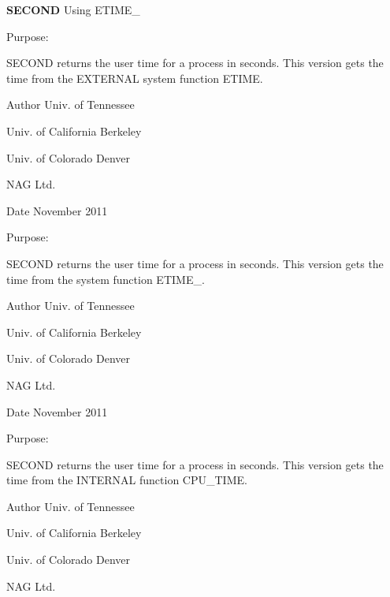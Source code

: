 {\bfseries S\+E\+C\+O\+N\+D} Using E\+T\+I\+M\+E\+\_\+

\begin{DoxyParagraph}{Purpose\+: }
\begin{DoxyVerb}  SECOND returns the user time for a process in seconds.
  This version gets the time from the EXTERNAL system function ETIME.\end{DoxyVerb}
 
\end{DoxyParagraph}
\begin{DoxyAuthor}{Author}
Univ. of Tennessee 

Univ. of California Berkeley 

Univ. of Colorado Denver 

N\+A\+G Ltd. 
\end{DoxyAuthor}
\begin{DoxyDate}{Date}
November 2011
\end{DoxyDate}
\begin{DoxyParagraph}{Purpose\+: }
\begin{DoxyVerb}  SECOND returns the user time for a process in seconds.
  This version gets the time from the system function ETIME_.\end{DoxyVerb}
 
\end{DoxyParagraph}
\begin{DoxyAuthor}{Author}
Univ. of Tennessee 

Univ. of California Berkeley 

Univ. of Colorado Denver 

N\+A\+G Ltd. 
\end{DoxyAuthor}
\begin{DoxyDate}{Date}
November 2011
\end{DoxyDate}
\begin{DoxyParagraph}{Purpose\+: }
\begin{DoxyVerb}  SECOND returns the user time for a process in seconds.
  This version gets the time from the INTERNAL function CPU_TIME.\end{DoxyVerb}
 
\end{DoxyParagraph}
\begin{DoxyAuthor}{Author}
Univ. of Tennessee 

Univ. of California Berkeley 

Univ. of Colorado Denver 

N\+A\+G Ltd. 
\end{DoxyAuthor}
